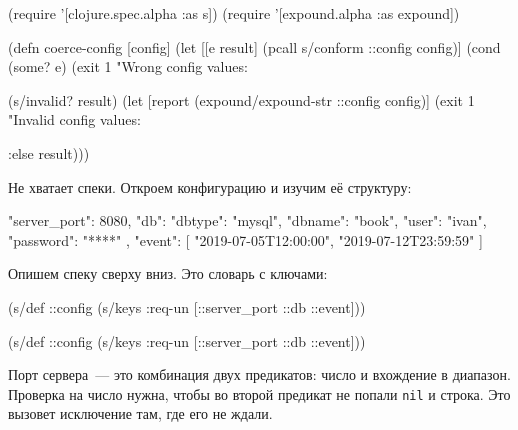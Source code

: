 \else

\begin{english}
  \begin{clojure}
(require '[clojure.spec.alpha :as s])
(require '[expound.alpha :as expound])

(defn coerce-config [config]
  (let [[e result] (pcall s/conform ::config config)]
    (cond
      (some? e)
      (exit 1 "Wrong config values: %

      (s/invalid? result)
      (let [report (expound/expound-str ::config config)]
        (exit 1 "Invalid config values: %

      :else result)))
  \end{clojure}
\end{english}

\fi

Не хватает спеки. Откроем конфигурацию и изучим её структуру:


\begin{english}
  \begin{json}
{
    "server_port": 8080,
    "db": {
        "dbtype":   "mysql",
        "dbname":   "book",
        "user":     "ivan",
        "password": "****"
    },
    "event": [
        "2019-07-05T12:00:00",
        "2019-07-12T23:59:59"
    ]
}
  \end{json}
\end{english}

\noindent
Опишем спеку сверху вниз. Это словарь с ключами:

\ifx\devicetype\mobile

\begin{english}
  \begin{clojure}
(s/def ::config
  (s/keys :req-un [::server_port
                   ::db ::event]))
  \end{clojure}
\end{english}

\else

\begin{english}
  \begin{clojure}
(s/def ::config
  (s/keys :req-un [::server_port ::db ::event]))
  \end{clojure}
\end{english}

\fi


Порт сервера~--- это комбинация двух предикатов: число и вхождение в диапазон.
Проверка на число нужна, чтобы во второй предикат не попали \verb|nil| и
строка. Это вызовет исключение там, где его не ждали.

